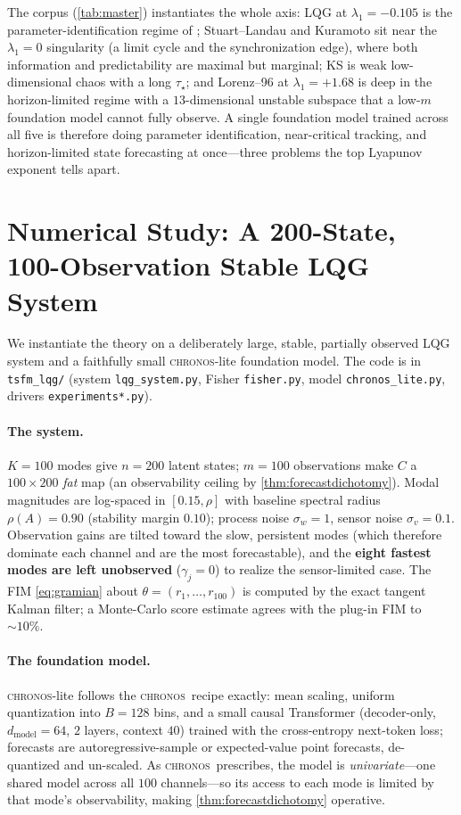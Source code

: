 \documentclass[10pt]{article}
\theoremstyle{plain}
\theoremstyle{definition}
\theoremstyle{remark}
\newcommand{\Chronos}{\textsc{chronos}}
\begin{document}
The corpus (\cref{tab:master}) instantiates the whole axis: LQG at
$\lambda_1=-0.105$ is the parameter-identification regime of
; Stuart--Landau and Kuramoto sit near the
$\lambda_1=0$ singularity (a limit cycle and the synchronization edge), where both
information and predictability are maximal but marginal; KS is weak low-dimensional
chaos with a long $\tau_\star$; and Lorenz--96 at $\lambda_1=+1.68$ is deep in the
horizon-limited regime with a $13$-dimensional unstable subspace that a
low-$m$ foundation model cannot fully observe. A single foundation model trained
across all five is therefore doing parameter identification, near-critical
tracking, and horizon-limited state forecasting at once---three problems the top
Lyapunov exponent tells apart.

\section{Numerical Study: A 200-State, 100-Observation Stable LQG System}
\label{sec:experiments}

We instantiate the theory on a deliberately large, stable, partially observed
LQG system and a faithfully small \Chronos-lite foundation model. The code is in
\texttt{tsfm\_lqg/} (system \texttt{lqg\_system.py}, Fisher \texttt{fisher.py},
model \texttt{chronos\_lite.py}, drivers \texttt{experiments*.py}).

\paragraph{The system.}
$K=100$ modes give $n=200$ latent states; $m=100$ observations make $C$ a
$100\times200$ \emph{fat} map (an observability ceiling by
\cref{thm:forecastdichotomy}). Modal magnitudes are log-spaced in $[0.15,\rho]$
with baseline spectral radius $\rho(A)=0.90$ (stability margin $0.10$); process
noise $\sigma_w=1$, sensor noise $\sigma_v=0.1$. Observation gains are tilted
toward the slow, persistent modes (which therefore dominate each channel and are
the most forecastable), and the \textbf{eight fastest modes are left unobserved}
($\gamma_j=0$) to realize the sensor-limited case. The FIM
\eqref{eq:gramian} about $\theta=(r_1,\dots,r_{100})$ is computed by the exact
tangent Kalman filter; a Monte-Carlo score estimate agrees with the plug-in FIM
to $\sim\!10\%$.

\paragraph{The foundation model.}
\Chronos-lite follows the \Chronos\ recipe exactly: mean scaling, uniform
quantization into $B=128$ bins, and a small causal Transformer (decoder-only,
$d_{\text{model}}=64$, $2$ layers, context $40$) trained with the cross-entropy
next-token loss; forecasts are autoregressive-sample or expected-value point
forecasts, de-quantized and un-scaled. As \Chronos\ prescribes, the model is
\emph{univariate}---one shared model across all $100$ channels---so its access to
each mode is limited by that mode's observability, making
\cref{thm:forecastdichotomy} operative.
\end{document}
